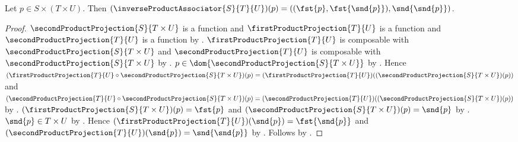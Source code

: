 \begin{proposition}\label{inverse_product_associator_apply}
    Let $p\in S\times(T\times U)$.
    Then $(\inverseProductAssociator{S}{T}{U})(p)
        =((\fst{p},\fst{\snd{p}}),\snd{\snd{p}})$.
\end{proposition}
\begin{proof}
    $\secondProductProjection{S}{T\times U}$ is a function and
        $\firstProductProjection{T}{U}$ is a function and
        $\secondProductProjection{T}{U}$ is a function by
        .
    $\firstProductProjection{T}{U}$ is composable with
        $\secondProductProjection{S}{T\times U}$ and
        $\secondProductProjection{T}{U}$ is composable with
        $\secondProductProjection{S}{T\times U}$ by
        .
    $p\in\dom{\secondProductProjection{S}{T\times U}}$ by
        .
    Hence $(\firstProductProjection{T}{U}\circ
        \secondProductProjection{S}{T\times U})(p)
        =(\firstProductProjection{T}{U})
            ((\secondProductProjection{S}{T\times U})(p))$ and
        $(\secondProductProjection{T}{U}\circ
        \secondProductProjection{S}{T\times U})(p)
        =(\secondProductProjection{T}{U})
            ((\secondProductProjection{S}{T\times U})(p))$ by
        .
    $(\firstProductProjection{S}{T\times U})(p)=\fst{p}$ and
        $(\secondProductProjection{S}{T\times U})(p)=\snd{p}$ by
        .
    $\snd{p}\in T\times U$ by .
    Hence $(\firstProductProjection{T}{U})(\snd{p})
        =\fst{\snd{p}}$ and
        $(\secondProductProjection{T}{U})(\snd{p})
        =\snd{\snd{p}}$ by
        .
    Follows by
        .
\end{proof}

